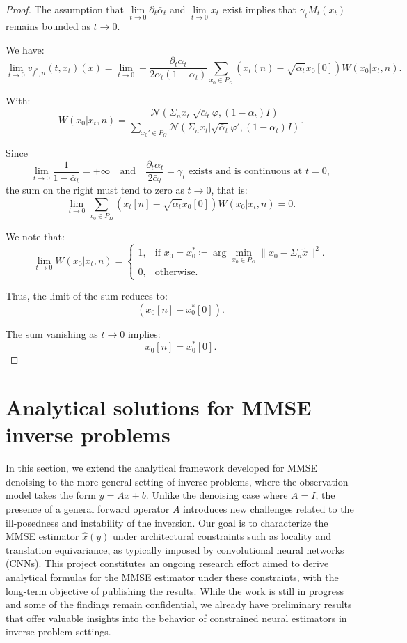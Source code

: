 \documentclass[a4paper,10pt]{article}
\theoremstyle{definition} %
\theoremstyle{definition} %
\theoremstyle{definition} %
\theoremstyle{definition} %
\newcommand{\0}{\boldsymbol{0}}
\begin{document}
\begin{proof}
    The assumption that \( \lim\limits_{t \to 0} \partial_t \bar \alpha_t \) and \( \lim\limits_{t \to 0} x_t \) exist implies that \( \gamma_t M_t(x_t) \) remains bounded as \( t \to 0 \).

    We have:
    \[
        \lim\limits_{t \to 0} v_{f^*,n}(t,x_t) (x) = \lim\limits_{t \to 0} - \frac{\partial_t \bar \alpha_t}{2\bar  \alpha_t (1 - \bar \alpha_t)} \sum_{x_0 \in P_{\Omega}} \left(x_t(n) - \sqrt{\bar{\alpha}_t} x_0[0]\right) W(x_0|x_t,n).
    \]

    With:
    \[
        W(x_0|x_t,n) = \frac{\mathcal{N}(\Sigma_n x_t | \sqrt{\bar{\alpha}_t} \varphi, (1 - \alpha_t)I)}
        {\sum\limits_{x_0' \in P_{\Omega}} \mathcal{N}(\Sigma_n x_t | \sqrt{\bar{\alpha}_t} \varphi', (1 - \alpha_t)I)}.
    \]

    Since 
    \[
        \lim\limits_{t \to 0} \frac{1}{1 - \bar \alpha_t} = +\infty 
        \quad \text{and} \quad 
        \frac{\partial_t \bar \alpha_t}{2 \bar \alpha_t} = \gamma_t \text{ exists and is continuous at } t=0,
    \]
    the sum on the right must tend to zero as \( t \to 0 \), that is:
    \[
        \lim\limits_{t \to 0} \sum_{x_0 \in P_{\Omega}} \left(x_t[n] - \sqrt{\bar{\alpha}_t} x_0[0]\right) W(x_0|x_t,n) = 0.
    \]

    We note that:
    \[
        \lim\limits_{t \to 0} W(x_0|x_t,n) =
        \begin{cases} 
        1, & \text{if } x_0 = x_0^* \coloneqq \arg \min_{x_0 \in P_{\Omega}} \|x_0 - \Sigma_n \tilde{x}\|^2. \\
        0, & \text{otherwise}.
        \end{cases}
    \]

    Thus, the limit of the sum reduces to:
    \[
        (x_0[n] - x_0^*[0]).
    \]

    The sum vanishing as \( t \to 0 \) implies:
    \[
        x_0[n] = x_0^*[0].
    \]
\end{proof}

\section{Analytical solutions for MMSE inverse problems}
In this section, we extend the analytical framework developed for MMSE denoising to the more general setting of inverse problems, where the observation model takes the form $y=Ax+b$. Unlike the denoising case where $A=I$, the presence of a general forward operator $A$ introduces new challenges related to the ill-posedness and instability of the inversion. Our goal is to characterize the MMSE estimator $\hat{x}(y)$ under architectural constraints such as locality and translation equivariance, as typically imposed by convolutional neural networks (CNNs). This project constitutes an ongoing research effort aimed to derive analytical formulas for the MMSE estimator under these constraints, with the long-term objective of publishing the results. While the work is still in progress and some of the findings remain confidential, we already have preliminary results that offer valuable insights into the behavior of constrained neural estimators in inverse problem settings.
\end{document}
